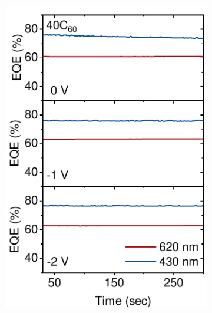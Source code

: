 \begin{figure}[htbp]
    \centering
    \begin{subfigure}{0.32\textwidth}
        \centering
        \includegraphics[width=\textwidth]{chapters/transport_layers/images/StaticEQE_40C60.pdf}
        \caption{}
        \label{}
    \end{subfigure}
    \hfill
    \begin{subfigure}{0.32\textwidth}
        \centering

\end{subfigure}
\end{figure}
